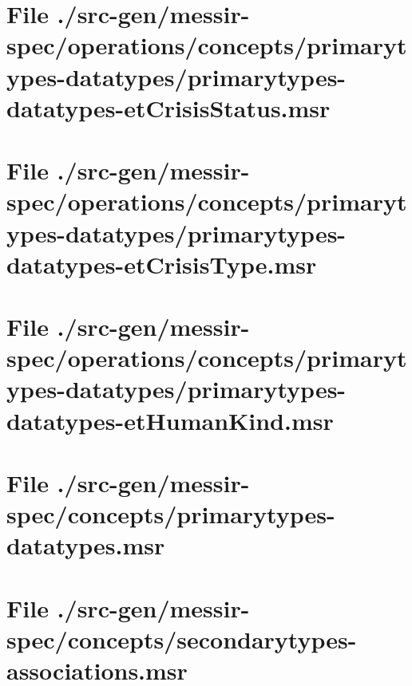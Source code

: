 \section[File /src-gen/messir-spec.../primarytypes-datatypes-etCrisisStatus.msr]{File ./src-gen/messir-spec/operations/concepts/primarytypes-datatypes/primarytypes-datatypes-etCrisisStatus.msr}
\scriptsize

\normalsize
	
\section[File /src-gen/messir-spec/operations.../primarytypes-datatypes-etCrisisType.msr]{File ./src-gen/messir-spec/operations/concepts/primarytypes-datatypes/primarytypes-datatypes-etCrisisType.msr}
\scriptsize

\normalsize
	
\section[File /src-gen/messir-spec/operations.../primarytypes-datatypes-etHumanKind.msr]{File ./src-gen/messir-spec/operations/concepts/primarytypes-datatypes/primarytypes-datatypes-etHumanKind.msr}
\scriptsize

\normalsize
	
\section[File /src-gen/messir-spec/concepts/primarytypes-datatypes.msr]{File ./src-gen/messir-spec/concepts/primarytypes-datatypes.msr}
\scriptsize

\normalsize
	
\section[File /src-gen/messir-spec/concepts/secondarytypes-associations.msr]{File ./src-gen/messir-spec/concepts/secondarytypes-associations.msr}
\scriptsize

\normalsize
	
